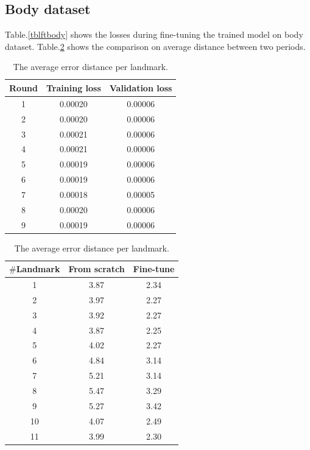 \documentclass[12pt,a4paper]{article}
\begin{document}
\subsection{Body dataset}
Table.\ref{tblftbody} shows the losses during fine-tuning the trained model on body dataset. Table.\ref{tblcmpbody} shows the comparison on average distance between two periods.
\begin{table}[ht]
\begin{minipage}[b]{0.5\textwidth}
	\centering
	\begin{tabular}{c c c}
	Round & Training loss & Validation loss \\ \hline
	1 & 0.00020 & 0.00006  \\ \hline
	2 & 0.00020 & 0.00006 \\ \hline
	3 & 0.00021 & 0.00006 \\ \hline
	4 & 0.00021 & 0.00006 \\ \hline
	5 & 0.00019 & 0.00006 \\ \hline
	6 & 0.00019 & 0.00006 \\ \hline
	7 & 0.00018 & 0.00005 \\ \hline
	8 & 0.00020 & 0.00006 \\ \hline
	9 & 0.00019 & 0.00006 \\ \hline
	\end{tabular}
	\caption{The losses during fine-tuning model on body dataset}
	\label{tblftbody}
\end{minipage}
\hfill
\begin{minipage}[b]{0.5\textwidth}

\centering
\begin{tabular}[t]{|c|c|c|}
\hline
\textbf{$\#$Landmark} & \textbf{From scratch} & \textbf{Fine-tune} \\ \hline
1 & 3.87 & 2.34  \\ \hline
2 & 3.97 & 2.27  \\ \hline
3 & 3.92  & 2.27 \\ \hline
4 & 3.87  & 2.25 \\ \hline
5 & 4.02  & 2.27 \\ \hline
6 & 4.84  & 3.14 \\ \hline
7 & 5.21  & 3.14 \\ \hline
8 & 5.47  & 3.29 \\ \hline
9 & 5.27  & 3.42 \\ \hline
10 & 4.07  & 2.49 \\ \hline
11 & 3.99  & 2.30 \\ \hline
\end{tabular}
\caption{The average error distance per landmark.}
\label{tblcmpbody}

\end{minipage}
\end{table}
\end{document}
